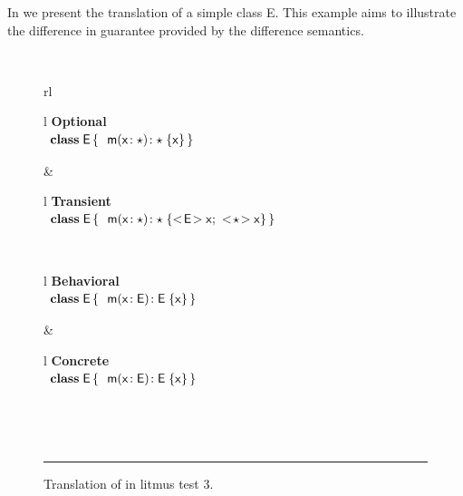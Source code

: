 \documentclass[a4paper,USenglish]{tex/lipics-v2016}
\begin{document}
In  we present the translation of a simple class {\xt E}.
This example aims to illustrate the difference in guarantee provided by the
difference semantics.

\begin{figure}[!h]
\hrulefill\\
  \begin{tabular}{rl}
\\
  \begin{tabular}{l}
    {\scriptsize\bf{Optional}} \\ 
\(
\begin{array}{l@{\,}l}
\Class{\xt E}{}{&\Mdef\m\x{\any}{\any}\x } \\
\end{array}
\) 
\end{tabular}&
  \begin{tabular}{l}
    {\scriptsize\bf{Transient}} \\
\(
\begin{array}{l@{\,}l}
\Class{\xt E}{}{&\Mdef\m\x\any\any{\SubCast{\xt E}\x ; ~ \SubCast{\any}{\x}}} \\
\end{array}
\)
\end{tabular}\\
  \begin{tabular}{l}
    {\scriptsize\bf{Behavioral}} \\
\(
\begin{array}{l@{\,}l}
\Class{\xt E}{}{&\Mdef\m\x{\xt E}{\xt E}\x} \\
\end{array}
\) 
\end{tabular} &
  \begin{tabular}{l}
    {\scriptsize\bf{Concrete}} \\
\(
\begin{array}{l@{\,}l}
\Class{\xt E}{}{&\Mdef\m\x{\xt E}{\xt E}\x} \\
\end{array}
\) 
\end{tabular}\\
  \end{tabular}\vspace{2mm}\\
\hrule\vspace{4mm}
  
 \caption{Translation of  in litmus test 3.}  \label{fig:l3etrans}
\end{figure}
\end{document}

